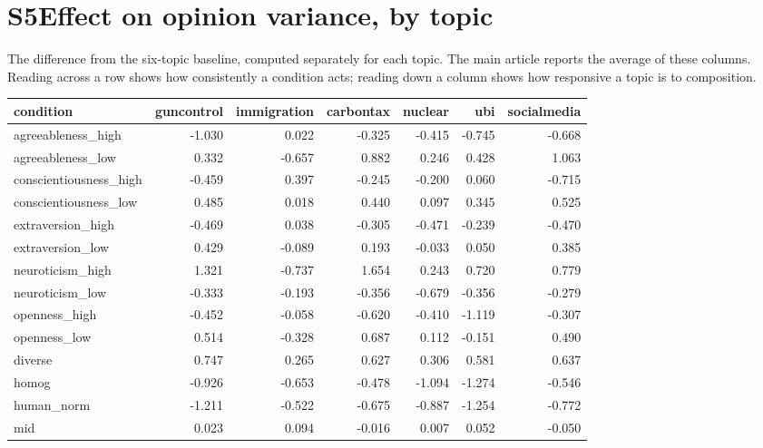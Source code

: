 \documentclass[11pt]{article}
\begin{document}
\medskip

\section*{S5\quad Effect on opinion variance, by topic}
The difference from the six-topic baseline, computed separately for each topic. The main article reports the average of these columns. Reading across a row shows how consistently a condition acts; reading down a column shows how responsive a topic is to composition.
\scriptsize
\setlength{\tabcolsep}{2.5pt}
\begin{longtable}{@{}lrrrrrr@{}}
\toprule
condition & guncontrol & immigration & carbontax & nuclear & ubi & socialmedia \\
\midrule
\endhead
agreeableness\_high & -1.030 & 0.022 & -0.325 & -0.415 & -0.745 & -0.668 \\
agreeableness\_low & 0.332 & -0.657 & 0.882 & 0.246 & 0.428 & 1.063 \\
conscientiousness\_high & -0.459 & 0.397 & -0.245 & -0.200 & 0.060 & -0.715 \\
conscientiousness\_low & 0.485 & 0.018 & 0.440 & 0.097 & 0.345 & 0.525 \\
extraversion\_high & -0.469 & 0.038 & -0.305 & -0.471 & -0.239 & -0.470 \\
extraversion\_low & 0.429 & -0.089 & 0.193 & -0.033 & 0.050 & 0.385 \\
neuroticism\_high & 1.321 & -0.737 & 1.654 & 0.243 & 0.720 & 0.779 \\
neuroticism\_low & -0.333 & -0.193 & -0.356 & -0.679 & -0.356 & -0.279 \\
openness\_high & -0.452 & -0.058 & -0.620 & -0.410 & -1.119 & -0.307 \\
openness\_low & 0.514 & -0.328 & 0.687 & 0.112 & -0.151 & 0.490 \\
diverse & 0.747 & 0.265 & 0.627 & 0.306 & 0.581 & 0.637 \\
homog & -0.926 & -0.653 & -0.478 & -1.094 & -1.274 & -0.546 \\
human\_norm & -1.211 & -0.522 & -0.675 & -0.887 & -1.254 & -0.772 \\
mid & 0.023 & 0.094 & -0.016 & 0.007 & 0.052 & -0.050 \\
\bottomrule
\end{longtable}
\normalsize

\medskip
\end{document}
